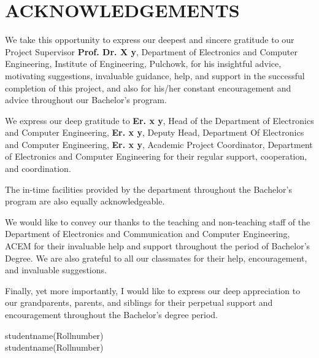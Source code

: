 \documentclass[main]{subfiles}
\begin{document}
\section*{\centering \Large{\textbf{\MakeUppercase{Acknowledgements}} }}

\noindent We take this opportunity to express our deepest and sincere gratitude to our Project Supervisor \textbf{Prof. Dr. X y}, Department of Electronics and Computer Engineering, Institute of Engineering, Pulchowk, for his insightful advice, motivating suggestions, invaluable guidance, help, and support in the successful completion of this project, and also for his/her constant encouragement and advice throughout our Bachelor's program.\par
\noindent We express our deep gratitude to \textbf{Er. x y}, Head of the Department of Electronics and Computer Engineering, \textbf{Er. x y}, Deputy Head, Department Of Electronics and Computer Engineering, \textbf{Er. x y}, Academic Project Coordinator, Department of Electronics and Computer Engineering for their regular support, cooperation, and coordination.\par
\noindent The in-time facilities provided by the department throughout the Bachelor's program are also equally acknowledgeable.\par
\noindent We would like to convey our thanks to the teaching and non-teaching staff of the Department of Electronics and Communication and Computer Engineering, ACEM for their invaluable help and support throughout the period of Bachelor’s Degree. We are also grateful to all our classmates for their help, encouragement, and invaluable suggestions.\par
\noindent Finally, yet more importantly, I would like to express our deep appreciation to our grandparents, parents, and siblings for their perpetual support and encouragement throughout the Bachelor’s degree period.\par
\vspace{1cm}

\noindent studentname(Rollnumber)\\
\noindent studentname(Rollnumber)
\end{document}
